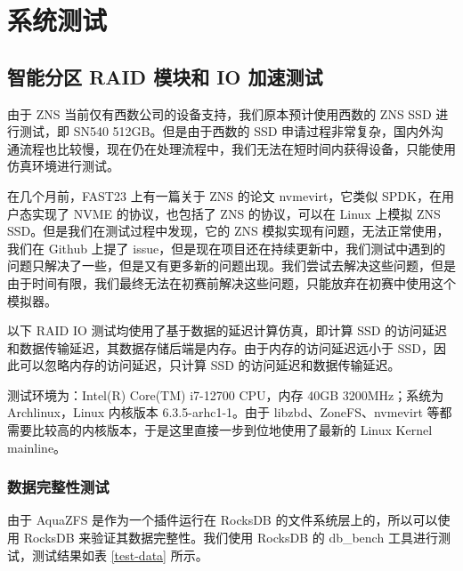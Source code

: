 \section{系统测试}

\subsection{智能分区 RAID 模块和 IO 加速测试}

由于 ZNS 当前仅有西数公司的设备支持，我们原本预计使用西数的 ZNS SSD 进行测试，即 SN540 512GB。但是由于西数的 SSD 申请过程非常复杂，国内外沟通流程也比较慢，现在仍在处理流程中，我们无法在短时间内获得设备，只能使用仿真环境进行测试。

在几个月前，FAST23 上有一篇关于 ZNS 的论文 nvmevirt\cite{kim_nvmevirt_nodate}，它类似 SPDK，在用户态实现了 NVME 的协议，也包括了 ZNS 的协议，可以在 Linux 上模拟 ZNS SSD。但是我们在测试过程中发现，它的 ZNS 模拟实现有问题，无法正常使用，我们在 Github 上提了 issue，但是现在项目还在持续更新中，我们测试中遇到的问题只解决了一些，但是又有更多新的问题出现。我们尝试去解决这些问题，但是由于时间有限，我们最终无法在初赛前解决这些问题，只能放弃在初赛中使用这个模拟器。

以下 RAID IO 测试均使用了基于数据的延迟计算仿真，即计算 SSD 的访问延迟和数据传输延迟，其数据存储后端是内存。由于内存的访问延迟远小于 SSD，因此可以忽略内存的访问延迟，只计算 SSD 的访问延迟和数据传输延迟。

测试环境为：Intel(R) Core(TM) i7-12700 CPU，内存 40GB 3200MHz；系统为 Archlinux，Linux 内核版本 6.3.5-arhc1-1。由于 libzbd、ZoneFS、nvmevirt 等都需要比较高的内核版本，于是这里直接一步到位地使用了最新的 Linux Kernel mainline。

\subsubsection{数据完整性测试}

由于 AquaZFS 是作为一个插件运行在 RocksDB 的文件系统层上的，所以可以使用 RocksDB 来验证其数据完整性。我们使用 RocksDB 的 db\_bench 工具进行测试，测试结果如表 \ref{test-data} 所示。

